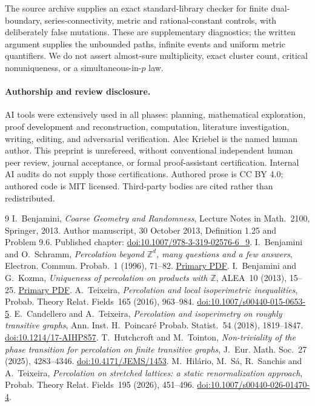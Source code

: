 \documentclass[11pt]{article}
\theoremstyle{definition}
\newcommand{\ZZ}{\mathbb Z}
\begin{document}
The source archive supplies an exact standard-library checker for finite
dual-boundary, series-connectivity, metric and rational-constant controls,
with deliberately false mutations. These are supplementary diagnostics;
the written argument supplies the unbounded paths, infinite events and
uniform metric quantifiers. We do not assert almost-sure multiplicity,
exact cluster count, critical nonuniqueness, or a simultaneous-in-$p$ law.

\paragraph{Authorship and review disclosure.}
AI tools were extensively used in all phases: planning, mathematical exploration,
proof development and reconstruction, computation, literature investigation,
writing, editing, and adversarial verification. Alec Kriebel is the named
human author. This preprint is unrefereed, without conventional independent
human peer review, journal acceptance, or formal proof-assistant certification.
Internal AI audits do not supply those certifications.
Authored prose is CC BY 4.0; authored code is MIT licensed.
Third-party bodies are cited rather than redistributed.

\begin{thebibliography}{9}\small
{} I.~Benjamini, \emph{Coarse Geometry and Randomness},
Lecture Notes in Math.~2100, Springer, 2013.
Author manuscript, 30 October 2013, Definition 1.25 and Problem 9.6.
Published chapter: \href{https://doi.org/10.1007/978-3-319-02576-6_9}{doi:10.1007/978-3-319-02576-6\_9}.
 I.~Benjamini and O.~Schramm, \emph{Percolation beyond $\ZZ^d$,
many questions and a few answers}, Electron. Commun. Probab.~1 (1996), 71--82.
\href{https://emis.de/ft/41630}{Primary PDF}.
 I.~Benjamini and G.~Kozma, \emph{Uniqueness of percolation on
products with $\ZZ$}, ALEA~10 (2013), 15--25.
\href{https://alea.math.cnrs.fr/articles/v10/10-02.pdf}{Primary PDF}.
 A.~Teixeira, \emph{Percolation and local isoperimetric
inequalities}, Probab. Theory Relat. Fields~165 (2016), 963--984.
\href{https://doi.org/10.1007/s00440-015-0653-5}{doi:10.1007/s00440-015-0653-5}.
 E.~Candellero and A.~Teixeira, \emph{Percolation and isoperimetry
on roughly transitive graphs}, Ann. Inst. H.~Poincar\'e Probab. Statist.~54
(2018), 1819--1847.
\href{https://doi.org/10.1214/17-AIHP857}{doi:10.1214/17-AIHP857}.
 T.~Hutchcroft and M.~Tointon,
\emph{Non-triviality of the phase transition for percolation on finite
transitive graphs}, J.~Eur. Math. Soc.~27 (2025), 4283--4346.
\href{https://doi.org/10.4171/JEMS/1453}{doi:10.4171/JEMS/1453}.
 M.~Hil\'ario, M.~S\'a, R.~Sanchis and A.~Teixeira,
\emph{Percolation on stretched lattices: a static renormalization approach},
Probab. Theory Relat. Fields~195 (2026), 451--496.
\href{https://doi.org/10.1007/s00440-026-01470-4}{doi:10.1007/s00440-026-01470-4}.
\end{thebibliography}
\end{document}
